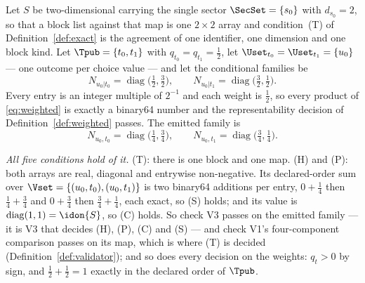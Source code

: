 
\begin{example}\label{ex:condfamily}
Let $S$ be two-dimensional carrying the single sector $\SecSet=\{s_0\}$ with
$d_{s_0}=2$, so that a block list against that map is one $2\times2$ array and
condition~(T) of Definition~\ref{def:exact} is the agreement of one identifier,
one dimension and one block kind. Let $\Tpub=\{t_0,t_1\}$ with
$q_{t_0}=q_{t_1}=\tfrac12$, let $\Uset_{t_0}=\Uset_{t_1}=\{u_0\}$ --- one
outcome per choice value --- and let the conditional families be
\begin{equation}\label{eq:condfam-bad}
  N_{u_0|t_0}=\operatorname{diag}\big(\tfrac12,\tfrac32\big),\qquad
  N_{u_0|t_1}=\operatorname{diag}\big(\tfrac32,\tfrac12\big).
\end{equation}
Every entry is an integer multiple of $2^{-1}$ and each weight is $\tfrac12$,
so every product of \eqref{eq:weighted} is exactly a binary64 number and the
representability decision of Definition~\ref{def:weighted} passes. The emitted
family is
\begin{equation*}
  N_{u_0,t_0}=\operatorname{diag}\big(\tfrac14,\tfrac34\big),\qquad
  N_{u_0,t_1}=\operatorname{diag}\big(\tfrac34,\tfrac14\big).
\end{equation*}

\emph{All five conditions hold of it.} (T): there is one block and one map.
(H) and (P): both arrays are real, diagonal and entrywise non-negative. Its
declared-order sum over $\Vset=\{(u_0,t_0),(u_0,t_1)\}$ is two binary64
additions per entry, $0+\tfrac14$ then $\tfrac14+\tfrac34$ and $0+\tfrac34$
then $\tfrac34+\tfrac14$, each exact, so
(S) holds; and its value is $\operatorname{diag}(1,1)=\idon{S}$, so (C) holds.
So check V3 passes on the emitted family --- it is V3 that decides (H), (P),
(C) and (S) --- and check V1's four-component comparison passes on its map,
which is where (T) is decided (Definition~\ref{def:validator}); and so does
every decision on the weights:
$q_t>0$ by sign, and $\tfrac12+\tfrac12=1$ exactly in the declared order of
$\Tpub$.


\end{example}
